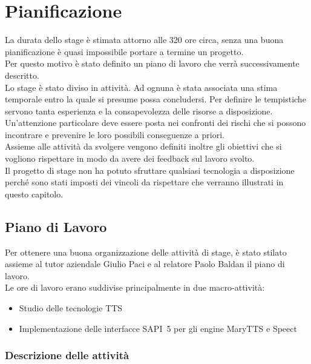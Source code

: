 \chapter{Pianificazione} %
La durata dello stage è stimata attorno alle 320 ore circa, senza una buona pianificazione è quasi impossibile portare a termine un progetto.\\
Per questo motivo è stato definito un piano di lavoro che verrà successivamente descritto.\\
Lo stage è stato diviso in attività. 
Ad ognuna è stata associata una stima temporale entro la quale si presume possa concludersi. Per definire le tempistiche servono tanta esperienza e la consapevolezza delle risorse a disposizione.\\
Un'attenzione particolare deve essere posta nei confronti dei rischi che si possono incontrare e prevenire le loro possibili conseguenze a priori.\\
Assieme alle attività da svolgere vengono definiti inoltre gli obiettivi che si vogliono rispettare in modo da avere dei feedback sul lavoro svolto.\\
Il progetto di stage non ha potuto sfruttare qualsiasi tecnologia a disposizione perché sono stati imposti dei vincoli da rispettare che verranno illustrati in questo capitolo. 

\thispagestyle{empty}

\newpage
\section{Piano di Lavoro}
Per ottenere una buona organizzazione delle attività di stage, è stato stilato assieme al tutor aziendale Giulio Paci e al relatore Paolo Baldan il piano di lavoro.\\
Le ore di lavoro erano suddivise principalmente in due macro-attività:
\begin{itemize}
	\item Studio delle tecnologie TTS
	\item Implementazione delle interfacce SAPI~5 per gli engine MaryTTS e Speect
\end{itemize}

\subsection{Descrizione delle attività}

